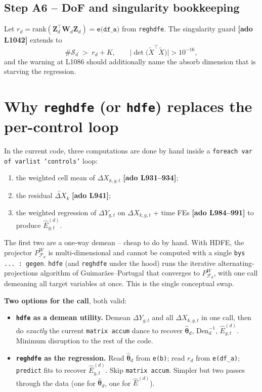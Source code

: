 \documentclass[11pt]{article}
\newcommand{\code}[1]{\texttt{\small #1}}
\newcommand{\Adoref}[1]{\textcolor{accent}{\footnotesize\textbf{[ado L#1]}}}
\newcommand{\1}{\mathbb{1}}
\newcommand{\Smpl}{\mathcal{S}}
\newcommand{\thetad}{\widehat{\bm{\theta}}_d}
\newcommand{\dY}{\Delta Y_{g,t}}
\newcommand{\dXk}{\Delta X_{k,g,t}}
\newcommand{\PdW}{P^{\!W}_{\mathcal{F}_d}}
\begin{document}
\subsection*{Step A6 -- DoF and singularity bookkeeping}

Let $r_d = \mathrm{rank}(\bm{Z}_d^{\top}\bm{W}_d\bm{Z}_d) = \texttt{e(df\_a)}$
from \texttt{reghdfe}. The singularity guard \Adoref{1042} extends to
\begin{equation}
\#\Smpl_d \;>\; r_d + K, \qquad
\bigl|\det\!\bigl(\widetilde{X}^{\top}\widetilde{X}\bigr)\bigr| > 10^{-16},
\label{eq:dofnew}
\end{equation}
and the warning at L1086 should additionally name the absorb dimension that
is starving the regression.

\section{Why \texttt{reghdfe} (or \texttt{hdfe}) replaces the per-control loop}

In the current code, three computations are done by hand inside a
\code{foreach var of varlist `controls'} loop:
\begin{enumerate}[leftmargin=*, itemsep=2pt]
\item the weighted cell mean of $\dXk$ \Adoref{931--934};
\item the residual $\widetilde{\Delta X}_{k}$ \Adoref{941};
\item the weighted regression of $\dY$ on $\dXk$ + time FEs \Adoref{984--991}
to produce $\widehat{E}^{(d)}_{g,t}$.
\end{enumerate}
The first two are a one-way demean -- cheap to do by hand. With HDFE, the
projector $\PdW$ is multi-dimensional and cannot be computed with a single
\code{bys ... : gegen}. \texttt{hdfe} (and \texttt{reghdfe} under the hood)
runs the iterative alternating-projections algorithm of
Guimarães--Portugal that converges to $\PdW$, with one call demeaning all
target variables at once. This is the single conceptual swap.

\medskip\noindent
\textbf{Two options for the call}, both valid:

\begin{itemize}[leftmargin=*, itemsep=4pt]
\item[\textbf{(O1)}] \textbf{\code{hdfe} as a demean utility.}\;
Demean $\dY$ and all $\dXk$ in one call, then do \emph{exactly} the current
\code{matrix accum} dance to recover $\thetad$, $\mathrm{Den}_d^{-1}$,
$\widehat{E}^{(d)}_{g,t}$. Minimum disruption to the rest of the code.
\item[\textbf{(O2)}] \textbf{\code{reghdfe} as the regression.}\;
Read $\thetad$ from \code{e(b)}; read $r_d$ from \code{e(df\_a)};
\code{predict} fits to recover $\widehat{E}^{(d)}_{g,t}$. Skip
\code{matrix accum}. Simpler but two passes through the data (one for
$\thetad$, one for $\widehat{E}^{(d)}$).
\end{itemize}
\end{document}
